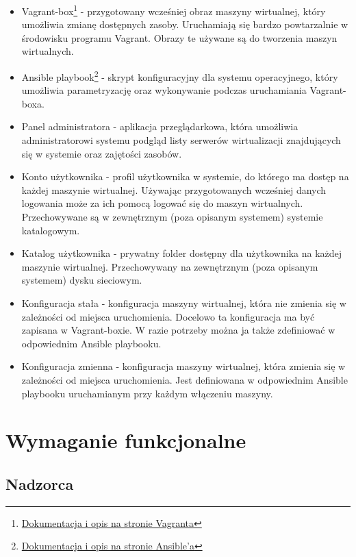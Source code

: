 \documentclass[../praca-dyplomowa.tex]{subfiles}
\begin{document}
\begin{itemize}
    \item Vagrant-box\footnote{\href{https://www.vagrantup.com/docs/boxes}{Dokumentacja i opis na stronie Vagranta}} - przygotowany wcześniej obraz maszyny wirtualnej, który umożliwia zmianę dostępnych zasoby. Uruchamiają się bardzo powtarzalnie w środowisku programu Vagrant. Obrazy te używane są do tworzenia maszyn wirtualnych.
    \item Ansible playbook\footnote{\href{https://www.redhat.com/en/topics/automation/what-is-an-ansible-playbook\#example-of-ansible-playbook}{Dokumentacja i opis na stronie Ansible'a}} - skrypt konfiguracyjny dla systemu operacyjnego, który umożliwia parametryzację oraz wykonywanie podczas uruchamiania Vagrant-boxa.
    \item Panel administratora - aplikacja przeglądarkowa, która umożliwia administratorowi systemu podgląd listy serwerów wirtualizacji znajdujących się w systemie oraz zajętości zasobów.
    \item Konto użytkownika - profil użytkownika w systemie, do którego ma dostęp na każdej maszynie wirtualnej. Używając przygotowanych wcześniej danych logowania może za ich pomocą logować się do maszyn wirtualnych. Przechowywane są w zewnętrznym (poza opisanym systemem) systemie katalogowym.
    \item Katalog użytkownika - prywatny folder dostępny dla użytkownika na każdej maszynie wirtualnej. Przechowywany na zewnętrznym (poza opisanym systemem) dysku sieciowym.
    \item Konfiguracja stała - konfiguracja maszyny wirtualnej, która nie zmienia się w zależności od miejsca uruchomienia. Docelowo ta konfiguracja ma być zapisana w Vagrant-boxie. W razie potrzeby można ja także zdefiniować w odpowiednim Ansible playbooku.
    \item Konfiguracja zmienna - konfiguracja maszyny wirtualnej, która zmienia się w zależności od miejsca uruchomienia. Jest definiowana w odpowiednim Ansible playbooku uruchamianym przy każdym włączeniu maszyny.
\end{itemize}

\section{Wymaganie funkcjonalne}

\subsection{Nadzorca}
\end{document}
